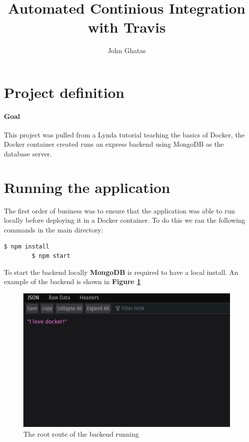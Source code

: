\documentclass{paper}
\title{Automated Continious Integration with Travis}
\date{\displaydate{date}}
\author{John Ghatas}
\begin{document}
    \maketitle
    \newpage
    
    \tableofcontents
    \newpage

    \section{Project definition}
    \paragraph{Goal}{This project was pulled from a Lynda tutorial teaching the basics of Docker, 
    the Docker container created runs an express backend using MongoDB as the database server.}

    \section{Running the application}{The first order of business was to ensure that the application
    was able to run locally before deploying it in a Docker container. To do this we ran the following commands in
    the main directory:
    \begin{lstlisting}[language=bash]
        $ npm install
        $ npm start
    \end{lstlisting}
    To start the backend locally \textbf{MongoDB} is required to have a local install. An example of the backend is shown
    in \textbf{Figure \ref{fig:backend}}
    \begin{figure}[!h]
        \centering
        \includegraphics[scale=2.6, pagebox=artbox]{Images/server.png}
        \caption{The root route of the backend running}
        \label{fig:backend}
    \end{figure}
    \newpage
    }
\end{document}
